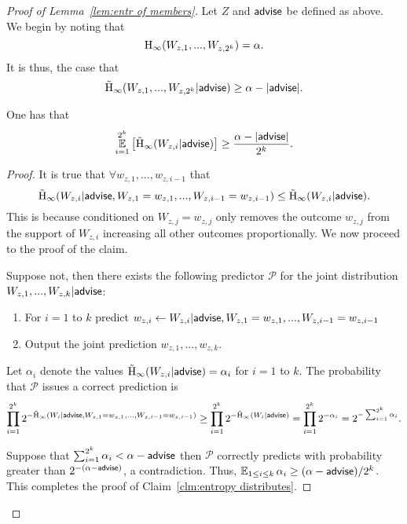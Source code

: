\begin{proof}[Proof of Lemma~\ref{lem:entr of members}]
Let $Z$ and ${\mathsf{advise}}$ be defined as above. We begin by noting that 
\[
\mathrm{H}_\infty(W_{z, 1},..., W_{z, 2^k})=\alpha.
\]
 It is thus, the case that 
\[
\tilde{\mathrm{H}}_\infty(W_{z, 1},..., W_{z, 2^ k} | {\mathsf{advise}}) \ge \alpha - |{\mathsf{advise}}|.
\]
\begin{claim}
One has that 
\begin{align*}
\operatorname*{\mathbb{E}}_{i=1}^{2^k} \left[\tilde{\mathrm{H}}_\infty(W_{z, i} | {\mathsf{advise}})\right] \ge \frac{\alpha - |{\mathsf{advise}}|}{2^k}.
\end{align*}
\label{clm:entropy distributes}
\end{claim}
\begin{proof}
It is true that $\forall w_{z,1},..., w_{z,i-1}$ that 
\[
\tilde{\mathrm{H}}_\infty(W_{z,i} | {\mathsf{advise}}, W_{z, 1}=w_{z,1},..., W_{z,i-1}=w_{z,i-1}) \le \tilde{\mathrm{H}}_\infty(W_{z,i} | {\mathsf{advise}}).
\]
This is because conditioned on $W_{z, j} =w_{z,j}$ only removes the outcome $w_{z,j}$ from the support of $W_{z,i}$ increasing all other outcomes proportionally.  
We now proceed to the proof of the claim. 

Suppose not, then there exists the following predictor $\mathcal{P}$ for the joint distribution $W_{z, 1},..., W_{z, k} | {\mathsf{advise}}$:
\begin{enumerate}
\item For $i=1$ to $k$ predict $w_{z,i}\leftarrow W_{z, i}| {\mathsf{advise}}, W_{z,1}=w_{z,1},..., W_{z,i-1}=w_{z,i-1}$
\item Output the joint prediction $w_{z,1},..., w_{z, k}$.  
\end{enumerate}
Let $\alpha_i$ denote the values $\tilde{\mathrm{H}}_\infty(W_{z,i}| {\mathsf{advise}}) = \alpha_i$ for $i=1$ to $k$. 
The probability that $\mathcal{P}$ issues a correct prediction is
\begin{align*}
\prod_{i=1}^{2^k} 2^{-\tilde{\mathrm{H}}_\infty(W_i | {\mathsf{advise}},  W_{z,1}=w_{z,1},..., W_{z,i-1}=w_{z,i-1})} \ge \prod_{i=1}^{2^k} 2^{-\tilde{\mathrm{H}}_\infty(W_i | {\mathsf{advise}})} = \prod_{i=1}^{2^k} 2^{-\alpha_i}  = 2^{-\sum_{i=1}^{2^k} \alpha_i}.
\end{align*}

\noindent
Suppose that $\sum_{i=1}^{2^k} \alpha_i < \alpha-{\mathsf{advise}}$ then $\mathcal{P}$ correctly predicts with probability greater than $2^{-(\alpha-{\mathsf{advise}})}$, a contradiction.  Thus, $\operatorname*{\mathbb{E}}_{1\le i\le k} \alpha_i \ge (\alpha-{\mathsf{advise}})/2^k$. 
This completes the proof of Claim~\ref{clm:entropy distributes}.
\end{proof}


\end{proof}
